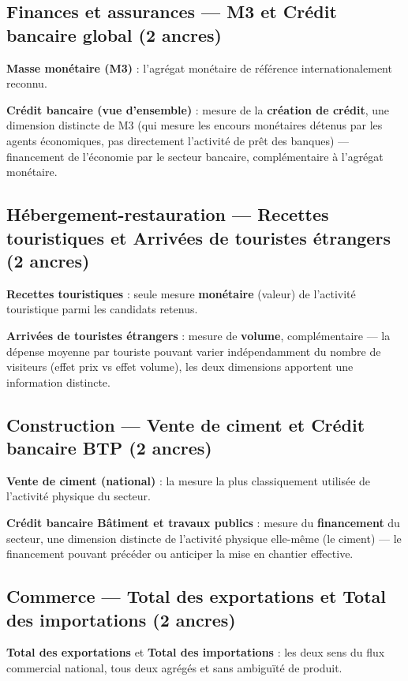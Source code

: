 \documentclass[11pt,a4paper]{article}
\begin{document}
\subsection{Finances et assurances --- M3 et Crédit bancaire global (2 ancres)}

\textbf{Masse monétaire (M3)} : l'agrégat monétaire de référence internationalement reconnu.

\textbf{Crédit bancaire (vue d'ensemble)} : mesure de la \textbf{création de crédit}, une dimension distincte de M3 (qui mesure les encours monétaires détenus par les agents économiques, pas directement l'activité de prêt des banques) --- financement de l'économie par le secteur bancaire, complémentaire à l'agrégat monétaire.

\subsection{Hébergement-restauration --- Recettes touristiques et Arrivées de touristes étrangers (2 ancres)}

\textbf{Recettes touristiques} : seule mesure \textbf{monétaire} (valeur) de l'activité touristique parmi les candidats retenus.

\textbf{Arrivées de touristes étrangers} : mesure de \textbf{volume}, complémentaire --- la dépense moyenne par touriste pouvant varier indépendamment du nombre de visiteurs (effet prix vs effet volume), les deux dimensions apportent une information distincte.

\subsection{Construction --- Vente de ciment et Crédit bancaire BTP (2 ancres)}

\textbf{Vente de ciment (national)} : la mesure la plus classiquement utilisée de l'activité physique du secteur.

\textbf{Crédit bancaire Bâtiment et travaux publics} : mesure du \textbf{financement} du secteur, une dimension distincte de l'activité physique elle-même (le ciment) --- le financement pouvant précéder ou anticiper la mise en chantier effective.

\subsection{Commerce --- Total des exportations et Total des importations (2 ancres)}

\textbf{Total des exportations} et \textbf{Total des importations} : les deux sens du flux commercial national, tous deux agrégés et sans ambiguïté de produit.
\end{document}
